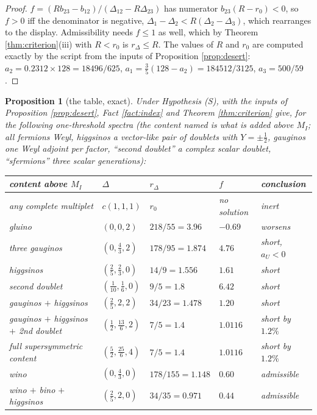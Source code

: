 \documentclass[11pt]{article}
\newtheorem{proposition}[theorem]{Proposition}
\theoremstyle{definition}
\newcommand{\Dl}{\Delta}
\begin{document}
\begin{proof}
$f = (Rb_{23} - b_{12})/(\Dl_{12} - R\Dl_{23})$ has numerator $b_{23}(R - r_{0}) < 0$, so $f > 0$ iff the denominator is negative, $\Dl_{1} - \Dl_{2} < R(\Dl_{2} - \Dl_{3})$, which rearranges to the display. Admissibility needs $f \le 1$ as well, which by Theorem \ref{thm:criterion}(iii) with $R < r_{0}$ is $r_{\Dl} \le R$. The values of $R$ and $r_{0}$ are computed exactly by the script from the inputs of Proposition \ref{prop:desert}: $a_{2} = 0.2312 \times 128 = 18496/625$, $a_{1} = \tfrac35(128 - a_{2}) = 184512/3125$, $a_{3} = 500/59$.
\end{proof}

\begin{proposition}[the table, exact]\label{prop:table}
Under Hypothesis (S), with the inputs of Proposition \ref{prop:desert}, Fact \ref{fact:index} and Theorem \ref{thm:criterion} give, for the following one-threshold spectra (the content named is what is added above $M_{I}$; all fermions Weyl, higgsinos a vector-like pair of doublets with $Y = \pm\tfrac12$, gauginos one Weyl adjoint per factor, ``second doublet'' a complex scalar doublet, ``sfermions'' three scalar generations):
\begin{center}\small
\begin{tabular}{@{}lllll@{}}
\toprule
content above $M_{I}$ & $\Dl$ & $r_{\Dl}$ & $f$ & conclusion \\
\midrule
any complete multiplet & $c(1,1,1)$ & $r_{0}$ & no solution & inert \\
gluino & $(0, 0, 2)$ & $218/55 = 3.96$ & $-0.69$ & worsens \\
three gauginos & $(0, \tfrac43, 2)$ & $178/95 = 1.874$ & $4.76$ & short, $a_{U} < 0$ \\
higgsinos & $(\tfrac25, \tfrac23, 0)$ & $14/9 = 1.556$ & $1.61$ & short \\
second doublet & $(\tfrac{1}{10}, \tfrac16, 0)$ & $9/5 = 1.8$ & $6.42$ & short \\
gauginos $+$ higgsinos & $(\tfrac25, 2, 2)$ & $34/23 = 1.478$ & $1.20$ & short \\
gauginos $+$ higgsinos $+$ 2nd doublet & $(\tfrac12, \tfrac{13}{6}, 2)$ & $7/5 = 1.4$ & $1.0116$ & short by $1.2\%$ \\
full supersymmetric content & $(\tfrac52, \tfrac{25}{6}, 4)$ & $7/5 = 1.4$ & $1.0116$ & short by $1.2\%$ \\
wino & $(0, \tfrac43, 0)$ & $178/155 = 1.148$ & $0.60$ & admissible \\
wino $+$ bino $+$ higgsinos & $(\tfrac25, 2, 0)$ & $34/35 = 0.971$ & $0.44$ & admissible \\

\end{tabular}
\end{center}
\end{proposition}
\end{document}
